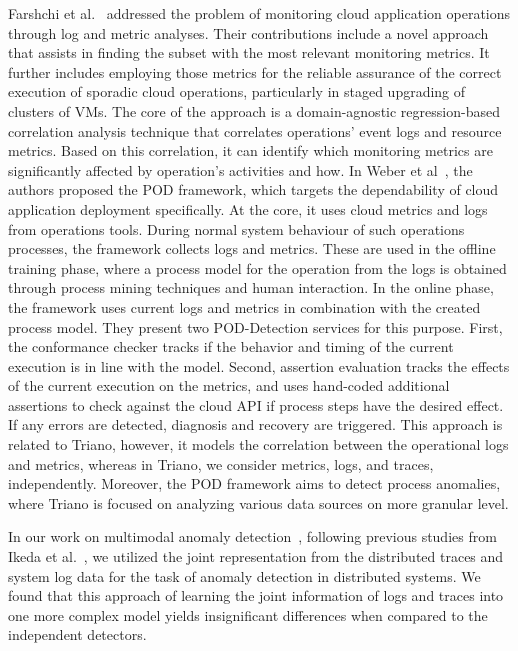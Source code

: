 Farshchi et al.~\cite{farshchi2018metric} addressed the problem of monitoring cloud application operations through log and metric analyses. Their contributions include a novel approach that assists in finding the subset with the most relevant monitoring metrics. It further includes employing those metrics for the reliable assurance of the correct execution of sporadic cloud operations, particularly in staged upgrading of clusters of VMs. The core of the approach is a domain-agnostic regression-based correlation analysis technique that correlates operations’ event logs and resource metrics. Based on this correlation, it can identify which monitoring metrics are significantly affected by operation’s activities and how. In Weber et al~\cite{weber2016dependability}, the authors proposed the POD framework, which targets the dependability of cloud application deployment specifically. At the core, it uses cloud metrics and logs from operations
tools. During normal system behaviour of such operations processes, the framework collects logs and metrics. These are used in the offline training phase, where a process model for the operation from the logs is obtained through process mining techniques and human interaction. In the online phase, the framework uses current logs and metrics in combination with the created process model. They present two POD-Detection services for this purpose. First, the conformance checker tracks if the behavior and timing of the current execution is in line with the model. Second, assertion evaluation tracks the effects of the current execution on the metrics, and uses hand-coded additional assertions to check against the cloud API if process steps have the desired effect. If any errors are detected, diagnosis and recovery are triggered. This approach is related to Triano, however, it models the correlation between the operational logs and metrics, whereas in Triano, we consider metrics, logs, and traces, independently. Moreover, the POD framework aims to detect process anomalies, where Triano is focused on analyzing various data sources on more granular level. 

In our work on multimodal anomaly detection~\cite{nedelkoski2020jointmodalities}, following previous studies from Ikeda et al.~\cite{Japan}, we utilized the joint representation from the distributed traces and system log data for the task of anomaly detection in distributed systems. We found that this approach of learning the joint information of logs and traces into one more complex model yields insignificant differences when compared to the independent detectors.

